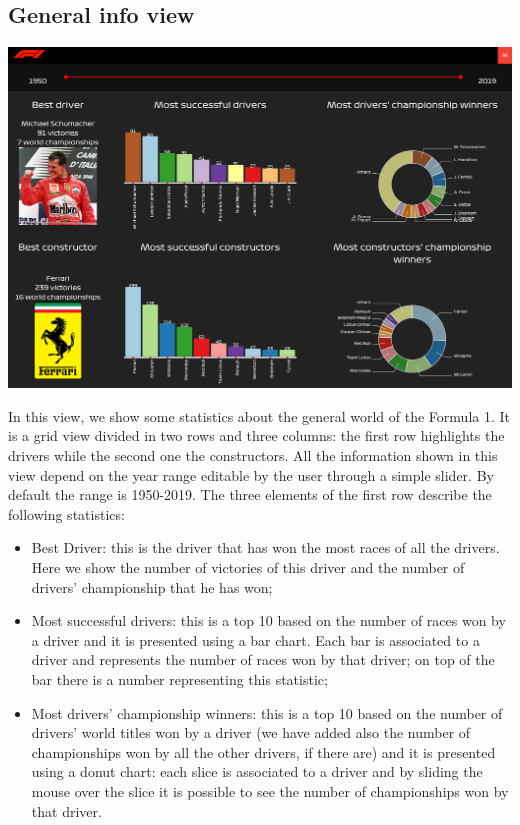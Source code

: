 \documentclass[11pt,twocolumn,letterpaper]{article}
\begin{document}
\subsection{General info view}
\begin{center}
	\centering
	\includegraphics[width=\columnwidth]{generalinfo}
\end{center}
In this view, we show some statistics about the general world of the Formula 1. It is a grid view divided in two rows and three columns: the first row highlights the drivers while the second one the constructors. All the information shown in this view depend on the year range editable by the user through a simple slider. By default the range is 1950-2019. The three elements of the first row describe the following statistics:
\begin{itemize}
	\item Best Driver: this is the driver that has won the most races of all the drivers. Here we show the number of victories of this driver and the number of drivers' championship that he has won;
	\item Most successful drivers: this is a top 10 based on the number of races won by a driver and it is presented using a bar chart. Each bar is associated to a driver and represents the number of races won by that driver; on top of the bar there is a number representing this statistic;
	\item Most drivers' championship winners: this is a top 10 based on the number of drivers' world titles won by a driver (we have added also the number of championships won by all the other drivers, if there are) and it is presented using a donut chart: each slice is associated to a driver and by sliding the mouse over the slice it is possible to see the number of championships won by that driver.
\end{itemize}
\end{document}
